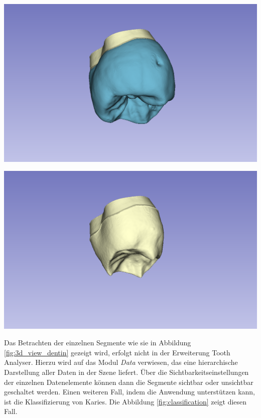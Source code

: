 \begin{minipage}{0.45\textwidth}
	\centering
	\includegraphics[scale=0.2, width=\textwidth]{img/3dView.png}
	\label{fig:3d_view}
\end{minipage}
\hfill
\begin{minipage}{0.45\textwidth}
	\centering
	\includegraphics[scale=0.2, width=\textwidth]{img/3dViewDentin.png}
	\label{fig:3d_view_dentin}
\end{minipage}

Das Betrachten der einzelnen Segmente wie sie in Abbildung
\ref{fig:3d_view_dentin} gezeigt wird, erfolgt nicht in der Erweiterung Tooth Analyser.
Hierzu wird auf das Modul \textit{Data} verwiesen, das eine hierarchische
Darstellung aller Daten in der Szene liefert. Über die Sichtbarkeitseinstellungen
der einzelnen Datenelemente können dann die Segmente sichtbar oder unsichtbar geschaltet
werden. Einen weiteren Fall, indem die Anwendung unterstützen kann, ist die
Klassifizierung von Karies. Die Abbildung \ref{fig:classification} zeigt diesen Fall.

